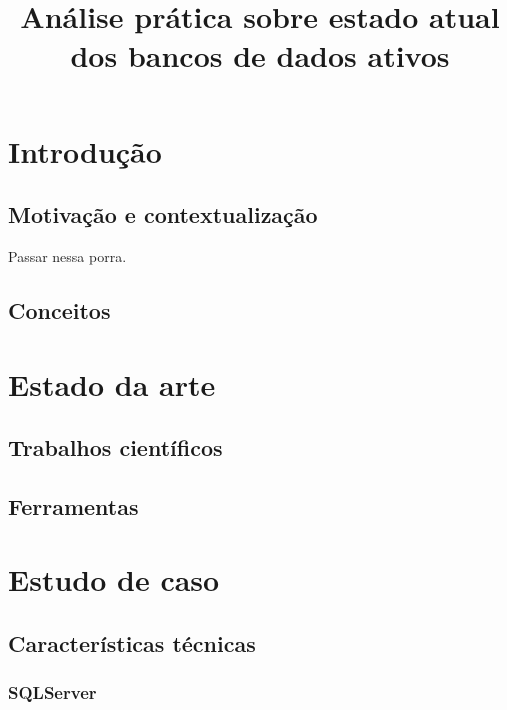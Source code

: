 \documentclass[conference]{IEEEtran}
\begin{document}
\title{Análise prática sobre estado atual dos bancos de dados ativos}

\author{
}

\maketitle
\IEEEpeerreviewmaketitle

\section{Introdução}
  \subsection{Motivação e contextualização}
	Passar nessa porra.

  \subsection{Conceitos}

\section{Estado da arte}
  \subsection{Trabalhos científicos}

  \subsection{Ferramentas}

\section{Estudo de caso}
  \subsection{Características técnicas}
    \subsubsection{SQLServer}
\end{document}
